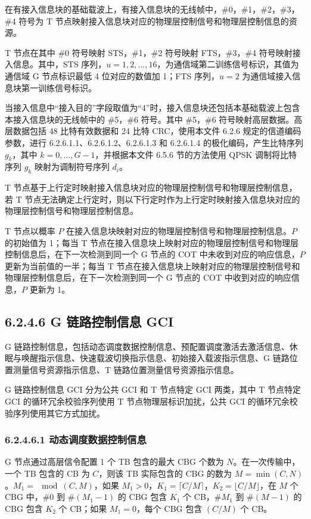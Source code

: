 \documentclass[11pt,a4paper]{ctexart}
\begin{document}
在有接入信息块的基础载波上，有接入信息块的无线帧中，\#0，\#1，\#2，\#3，\#4 符号为 T 节点映射接入信息块对应的物理层控制信号和物理层控制信息的资源。

T 节点在其中 \#0 符号映射 STS，\#1，\#2 符号映射 FTS，\#3，\#4 符号映射接入信息。其中，STS 序列，$u = 1, 2, \ldots, 16$，为通信域第二训练信号标识，其值为通信域 G 节点标识最低 4 位对应的数值加 1；FTS 序列，$u = 2$ 为通信域接入信息块第一训练信号标识。

当接入信息中``接入目的''字段取值为``4''时，接入信息块还包括本基础载波上包含本接入信息块的无线帧中的 \#5，\#6 符号。其中 \#5，\#6 符号映射高层数据。高层数据包括 48 比特有效数据和 24 比特 CRC，使用本文件 6.2.6 规定的信道编码参数，进行 6.2.6.1.1、6.2.6.1.2、6.2.6.1.3 和 6.2.6.1.4 的极化编码，产生比特序列 $g_k$，其中 $k = 0, \ldots, G-1$，并根据本文件 6.5.6 节的方法使用 QPSK 调制将比特序列 $g_k$ 映射为调制符号序列 $d_i$。

T 节点基于上行定时映射接入信息块对应的物理层控制信号和物理层控制信息，若 T 节点无法确定上行定时，则以下行定时作为上行定时映射接入信息块对应的物理层控制信号和物理层控制信息。

T 节点以概率 $P$ 在接入信息块映射对应的物理层控制信号和物理层控制信息。$P$ 的初始值为 1；每当 T 节点在接入信息块上映射对应的物理层控制信号和物理层控制信息后，在下一次检测到同一个 G 节点的 COT 中未收到对应的响应信息，$P$ 更新为当前值的一半；每当 T 节点在接入信息块上映射对应的物理层控制信号和物理层控制信息后，在下一次检测到同一个 G 节点的 COT 中收到对应的响应信息，$P$ 更新为 1。

\subsection{6.2.4.6 G 链路控制信息 GCI}

G 链路控制信息，包括动态调度数据控制信息、预配置调度激活去激活信息、休眠与唤醒指示信息、快速载波切换指示信息、初始接入载波指示信息、G 链路位置测量信号资源指示信息、T 链路位置测量信号资源指示信息。

G 链路控制信息 GCI 分为公共 GCI 和 T 节点特定 GCI 两类，其中 T 节点特定 GCI 的循环冗余校验序列使用 T 节点物理层标识加扰，公共 GCI 的循环冗余校验序列使用其它方式加扰。

\subsubsection{6.2.4.6.1 动态调度数据控制信息}

G 节点通过高层信令配置 1 个 TB 包含的最大 CBG 个数为 $N$。在一次传输中，一个 TB 包含的 CB 为 $C$，则该 TB 实际包含的 CBG 的数为 $M = \min(C, N)$。$M_1 = \mod(C, M)$，如果 $M_1 > 0$，$K_1 = \lceil C/M \rceil$，$K_2 = \lfloor C/M \rfloor$，在 $M$ 个 CBG 中，\#0 到 \#$(M_1-1)$ 的 CBG 包含 $K_1$ 个 CB，\#$M_1$ 到 \#$(M-1)$ 的 CBG 包含 $K_2$ 个 CB；如果 $M_1 = 0$，每个 CBG 包含 $(C/M)$ 个 CB。
\end{document}
